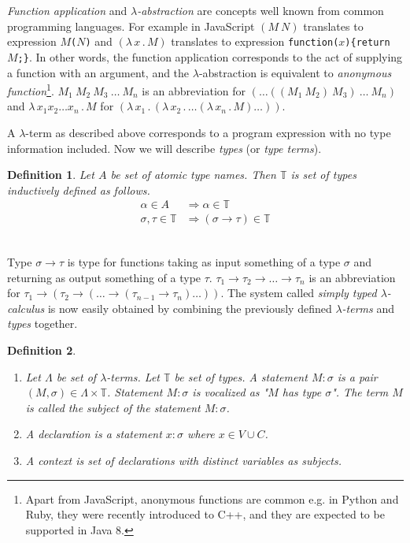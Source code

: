 \documentclass[conference]{IEEEtran}
\newtheorem{definition}{Definition}
\newcommand{\lterm}{$\lambda$-term\xspace}
\newcommand{\lterms}{$\lambda$-terms\xspace}
\newcommand{\then}{\Rightarrow\xspace}
\newcommand{\lamb}[2]{( \lambda \, #1 \, . \, #2 )}
\newcommand{\lam}[2]{\lambda \, #1 \, . \, #2}
\newcommand{\ar}{\rightarrow\xspace}
\newcommand{\T}{\mathbb{T}\xspace}
\begin{document}
\textit{Function application} and 
\textit{$\lambda$-abstraction} are concepts
well known from common programming languages. 
For example in JavaScript 
$(M~N)$ translates to expression \texttt{$M$($N$)} and
$\lamb{x}{M}$ translates to expression \texttt{function($x$)\{return $M$;\}}.
In other words, the function application 
corresponds to the act of supplying a function 
with an argument, and
the $\lambda$-abstraction is equivalent to 
\textit{anonymous function}\footnote{Apart from JavaScript, anonymous functions are common e.g. in Python and Ruby, 
they were recently introduced to C++, and they are expected to be supported in Java 8.}.
$M_1~M_2~M_3~\dots~M_n$ is an abbreviation for $(\dots((M_1~M_2)~M_3)~\dots~M_n)$
and $\lam{x_1 x_2 \dots x_n }{M}$ for $\lamb{x_1}{\lamb{x_2}{\dots\lamb{x_n}{M}\dots}}$.

A \lterm as described above
corresponds to a program expression with no type information
included. Now we will describe \textit{types} (or \textit{type terms}).\\

\begin{definition}
Let $A$ be set of {\it atomic type names}. 
Then $\mathbb{T}$ is set of {\it types} inductively defined as follows.
\begin{align*}
\alpha      \in A  &\then   \alpha \in \T \\
\sigma,\tau \in \T &\then ( \sigma \ar  \tau ) \in \T 
\end{align*}
\end{definition}
~\\

Type $\sigma \ar \tau$ is type for functions taking as input
something of a type $\sigma$ and returning 
as output something of a type $\tau$. 
$\tau_1 \ar \tau_2 \ar \dots \ar \tau_n$ is an abbreviation for 
$\tau_1 \ar (\tau_2 \ar (\dots \ar (\tau_{n-1} \ar \tau_n)\dots))$.
The system called \textit{simply typed $\lambda$-calculus} is now easily obtained by
combining the previously defined \textit{\lterms} and \textit{types} together. \\


\begin{definition}~

\begin{enumerate}
 \item 	Let $\Lambda$ be set of {\it \lterms}. 
	Let $\mathbb{T}$ be set of {\it types}.       
	A {\it statement} $M : \sigma$ is a pair 
	$(M,\sigma) \in \Lambda \times \mathbb{T}$.
	Statement $M : \sigma$ is vocalized as 
	{\it "$M$ has type $\sigma$"}.
	The term $M$ is called the {\it subject} of the 
	statement $M : \sigma$.
 \item A \textit{declaration} is a statement 
 $x : \sigma$ where $x \in V \cup C$.
  
 \item A \textit{context} 
 is set of declarations with distinct variables as subjects.
\end{enumerate}
\end{definition}
\end{document}
